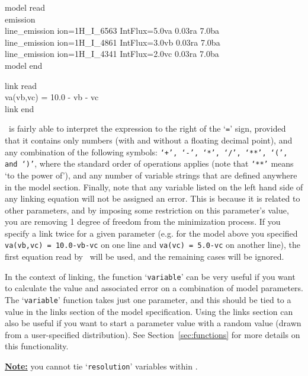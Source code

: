 \vspace{0.3cm}
\begin{mdframed}[style=MyFrame]
model read\\
emission\\
line\_emission ion=1H\_I\_6563     IntFlux=5.0va         0.03ra       7.0ba\\
line\_emission ion=1H\_I\_4861     IntFlux=3.0vb         0.03ra       7.0ba\\
line\_emission ion=1H\_I\_4341     IntFlux=2.0vc         0.03ra       7.0ba\\
model end\\

\vspace{0.1cm}

\noindent
link read\\
va(vb,vc) = 10.0 - vb - vc\\
link end\\
\end{mdframed}
\vspace{0.2cm}


\alis\ is fairly able to interpret the expression to the right of the `\texttt{=}' sign, provided that
it contains only numbers (with and without a floating decimal point), and any combination
of the following symbols: \texttt{`+', `-', `*', `/', `**', `(', and `)'}, where the standard order of operations
applies (note that \texttt{`**'} means `to the power of'), and any number of variable strings that are
defined anywhere in the model section. Finally, note that any variable listed on the left hand side
of any linking equation will not be assigned an error. This is because it is related to other parameters,
and by imposing some restriction on this parameter's value, you are removing 1 degree of freedom
from the minimization process. If you specify a link twice for a given parameter (e.g. for the model
above you specified \texttt{va(vb,vc) = 10.0-vb-vc} on one line and \texttt{va(vc) = 5.0-vc} on another
line), the first equation read by \alis\ will be used, and the remaining cases will be ignored.

In the context of linking, the function `\texttt{variable}' can be very useful if you want to calculate
the value and associated error on a combination of model parameters. The `\texttt{variable}'
function takes just one parameter, and this should be tied to a value in the links section of the
model specification. Using the links section can also be useful if you want to start a parameter
value with a random value (drawn from a user-specified distribution).
See Section~\ref{sec:functions} for more details on this functionality.

\textbf{\underline{Note:}} you cannot tie `\texttt{resolution}' variables within \alis.
